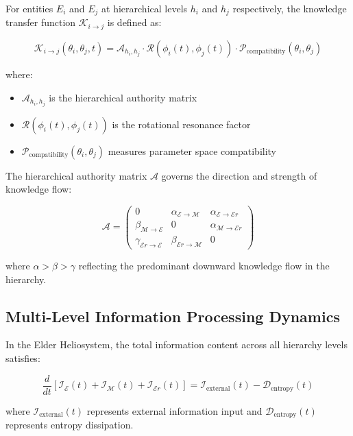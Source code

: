 \begin{definition}
For entities $E_i$ and $E_j$ at hierarchical levels $h_i$ and $h_j$ respectively, the knowledge transfer function $\mathcal{K}_{i \rightarrow j}$ is defined as:

\begin{equation}
\mathcal{K}_{i \rightarrow j}(\theta_i, \theta_j, t) = \mathcal{A}_{h_i,h_j} \cdot \mathcal{R}(\phi_i(t), \phi_j(t)) \cdot \mathcal{P}_{\text{compatibility}}(\theta_i, \theta_j)
\end{equation}

where:
\begin{itemize}
    \item $\mathcal{A}_{h_i,h_j}$ is the hierarchical authority matrix
    \item $\mathcal{R}(\phi_i(t), \phi_j(t))$ is the rotational resonance factor
    \item $\mathcal{P}_{\text{compatibility}}(\theta_i, \theta_j)$ measures parameter space compatibility
\end{itemize}
\end{definition}

\begin{definition}
The hierarchical authority matrix $\mathcal{A}$ governs the direction and strength of knowledge flow:

\begin{equation}
\mathcal{A} = \begin{pmatrix}
0 & \alpha_{\mathcal{E} \rightarrow \mathcal{M}} & \alpha_{\mathcal{E} \rightarrow \mathcal{E}r} \\
\beta_{\mathcal{M} \rightarrow \mathcal{E}} & 0 & \alpha_{\mathcal{M} \rightarrow \mathcal{E}r} \\
\gamma_{\mathcal{E}r \rightarrow \mathcal{E}} & \beta_{\mathcal{E}r \rightarrow \mathcal{M}} & 0
\end{pmatrix}
\end{equation}

where $\alpha > \beta > \gamma$ reflecting the predominant downward knowledge flow in the hierarchy.
\end{definition}

\subsection{Multi-Level Information Processing Dynamics}

\begin{theorem}
In the Elder Heliosystem, the total information content across all hierarchy levels satisfies:

\begin{equation}
\frac{d}{dt}\left[\mathcal{I}_{\mathcal{E}}(t) + \mathcal{I}_{\mathcal{M}}(t) + \mathcal{I}_{\mathcal{E}r}(t)\right] = \mathcal{I}_{\text{external}}(t) - \mathcal{D}_{\text{entropy}}(t)
\end{equation}

where $\mathcal{I}_{\text{external}}(t)$ represents external information input and $\mathcal{D}_{\text{entropy}}(t)$ represents entropy dissipation.
\end{theorem}

